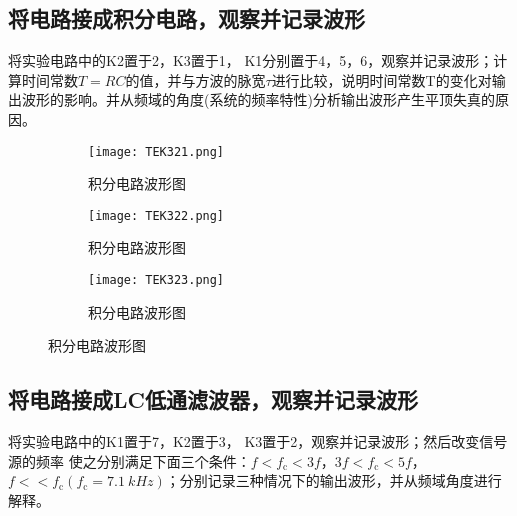 \subsection{将电路接成积分电路，观察并记录波形}%
\label{sub:将电路接成积分电路，观察并记录波形}

将实验电路中的K2置于2，K3置于1， K1分别置于4，5，6，观察并记录波形；计算时间常数$ T=RC $的值，并与方波的脉宽$ \tau $进行比较，说明时间常数T的变化对输出波形的影响。并从频域的角度(系统的频率特性)分析输出波形产生平顶失真的原因。

\begin{figure}[htpb]
	\centering
	\begin{subfigure}[htpb]{.31\linewidth}
		\centering
		\texttt{[image: TEK321.png]}
		\caption{积分电路波形图}
		\label{fig:积分电路波形图\arabic{subfigure}}
	\end{subfigure}
	\quad
	\begin{subfigure}[htpb]{.31\linewidth}
		\centering
		\texttt{[image: TEK322.png]}
		\caption{积分电路波形图}
		\label{fig:积分电路波形图\arabic{subfigure}}
	\end{subfigure}
	\quad
	\begin{subfigure}[htpb]{.31\linewidth}
		\centering
		\texttt{[image: TEK323.png]}
		\caption{积分电路波形图}
		\label{fig:积分电路波形图\arabic{subfigure}}
	\end{subfigure}
	\caption{积分电路波形图}
	\label{fig:积分电路波形图}
\end{figure}

\subsection{将电路接成LC低通滤波器，观察并记录波形}%
\label{sub:将电路接成LC低通滤波器，观察并记录波形}

将实验电路中的K1置于7，K2置于3， K3置于2，观察并记录波形；然后改变信号源的频率 使之分别满足下面三个条件：$ f<f_\text{c}<3f $，$ 3f<f_\text{c}<5f $，$ f<<f_\text{c}(f_\text{c}=\SI{7.1}{kHz})$；分别记录三种情况下的输出波形，并从频域角度进行解释。

